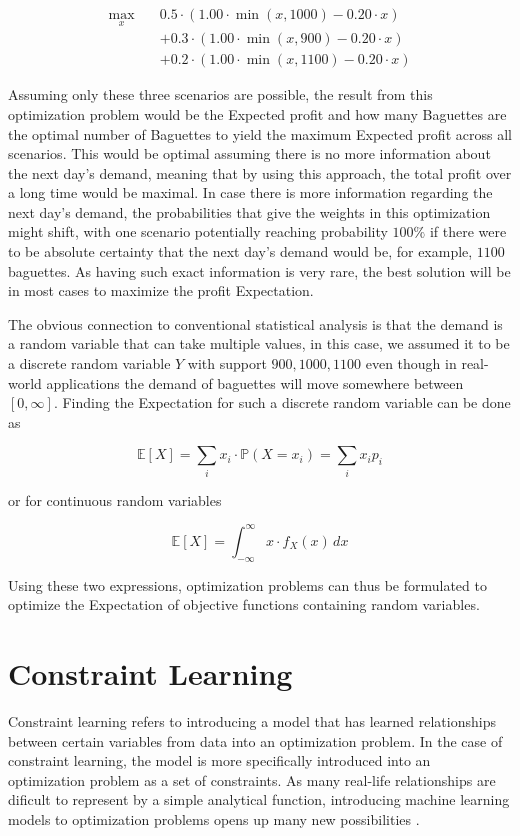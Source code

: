 \begin{align*}
	\max_{x} \quad & 0.5 \cdot \left(1.00 \cdot \min(x,1000) - 0.20 \cdot x \right) \\
	&+ 0.3 \cdot \left(1.00 \cdot \min(x,900) - 0.20 \cdot x\right) \\
	&+ 0.2 \cdot \left(1.00 \cdot \min(x,1100) - 0.20 \cdot x\right)
\end{align*}

Assuming only these three scenarios are possible, the result from this optimization problem would be the Expected profit and how many Baguettes are the optimal number of Baguettes to yield the maximum Expected profit across all scenarios. This would be optimal assuming there is no more information about the next day's demand, meaning that by using this approach, the total profit over a long time would be maximal. In case there is more information regarding the next day's demand, the probabilities that give the weights in this optimization might shift, with one scenario potentially reaching probability $100\%$ if there were to be absolute certainty that the next day's demand would be, for example, $1100$ baguettes. As having such exact information is very rare, the best solution will be in most cases to maximize the profit Expectation. 

The obvious connection to conventional statistical analysis is that the demand is a random variable that can take multiple values, in this case, we assumed it to be a discrete random variable $Y$ with support ${900,1000,1100}$ even though in real-world applications the demand of baguettes will move somewhere between $[0,\infty]$. Finding the Expectation for such a discrete random variable can be done as 

\[
\mathbb{E}[X] = \sum_{i} x_i \cdot \mathbb{P}(X = x_i) = \sum_{i} x_i p_i
\]

or for continuous random variables  
 
\[
\mathbb{E}[X] = \int_{-\infty}^{\infty} x \cdot f_X(x) \, dx
\]

Using these two expressions, optimization problems can thus be formulated to optimize the Expectation of objective functions containing random variables. \cite{BirgeLouveauxStochasticProgramming}


\section{Constraint Learning} \label{sec:constraint_learning}

Constraint learning refers to introducing a model that has learned relationships between certain variables from data into an optimization problem. In the case of constraint learning, the model is more specifically introduced into an optimization problem as a set of constraints. As many real-life relationships are dificult to represent by a simple analytical function, introducing machine learning models to optimization problems opens up many new possibilities \cite{FAJEMISIN20241}.

